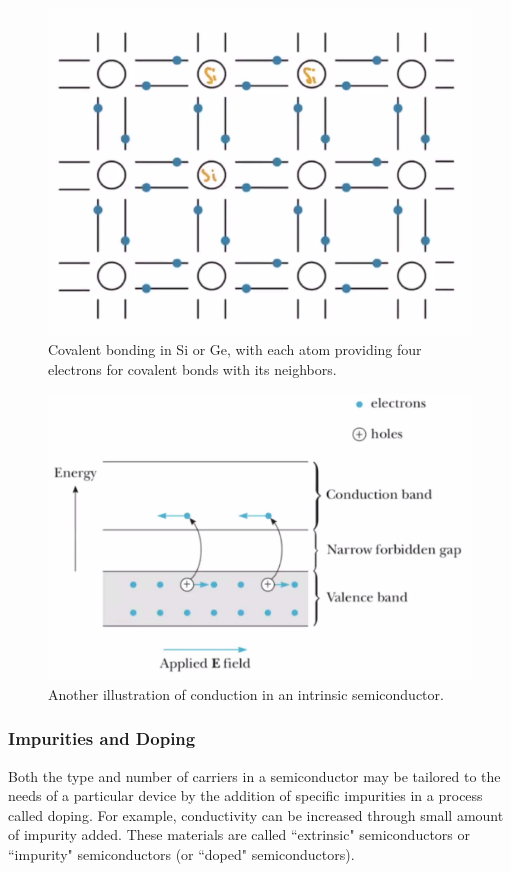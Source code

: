 \documentclass[class=article,crop=false]{standalone}
\begin{document}
\begin{figure}[h!]
	\centering
	\includegraphics[width=.8\linewidth]{./Images/intrinsic.png}
	\caption{Covalent bonding in Si or Ge, with each atom providing four electrons for covalent bonds with its neighbors.}
\end{figure}

\begin{figure}[h!]
	\centering
	\includegraphics[width=.8\linewidth]{./Images/intrinsic2.png}
	\caption{Another illustration of conduction in an intrinsic semiconductor.}
\end{figure}

\subsubsection{Impurities and Doping}

Both the type and number of carriers in a semiconductor may be tailored to the needs of a particular device by the addition of specific impurities in a process called doping. For example, conductivity can be increased through small amount of impurity added. These materials are called ``extrinsic" semiconductors or ``impurity" semiconductors (or ``doped" semiconductors).
\end{document}
